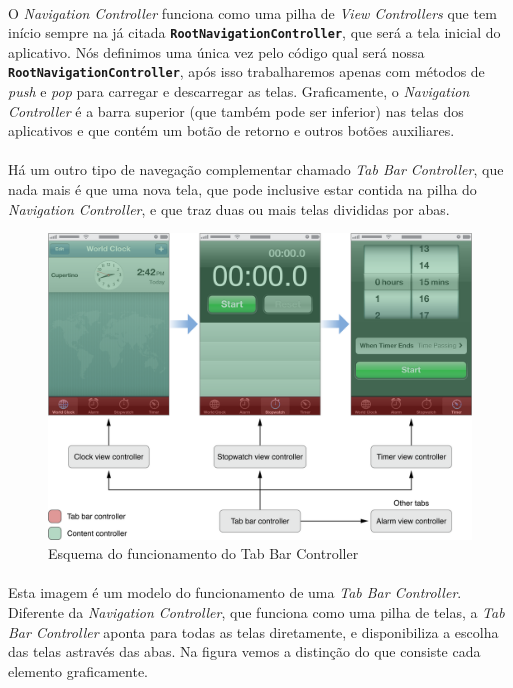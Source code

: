 \documentclass[a4paper,12pt,brazil,doubleside]{book}
\begin{document}
\paragraph{}O \emph{Navigation Controller} funciona como uma pilha de \emph{View Controllers} que tem início sempre na já citada \texttt{\textbf{RootNavigationController}}, que será a tela inicial do aplicativo. Nós definimos uma única vez pelo código qual será nossa \texttt{\textbf{RootNavigationController}}, após isso trabalharemos apenas com métodos de \emph{push} e \emph{pop} para carregar e descarregar as telas. Graficamente, o \emph{Navigation Controller} é a barra superior (que também pode ser inferior) nas telas dos aplicativos e que contém um botão de retorno e outros botões auxiliares.
\paragraph{}Há um outro tipo de navegação complementar chamado \emph{Tab Bar Controller}, que nada mais é que uma nova tela, que pode inclusive estar contida na pilha do \emph{Navigation Controller}, e que traz duas ou mais telas divididas por abas.

\pagebreak

\begin{figure}[h]
  \centering
  \includegraphics[totalheight=0.4\textheight]{figuras/apple_tabbar_interface.png}
  \caption{Esquema do funcionamento do Tab Bar Controller}
  \label{fig:a}
\end{figure}

\paragraph{}Esta imagem é um modelo do funcionamento de uma \emph{Tab Bar Controller}. Diferente da \emph{Navigation Controller}, que funciona como uma pilha de telas, a \emph{Tab Bar Controller} aponta para todas as telas diretamente, e disponibiliza a escolha das telas astravés das abas. Na figura vemos a distinção do que consiste cada elemento graficamente.
\end{document}
